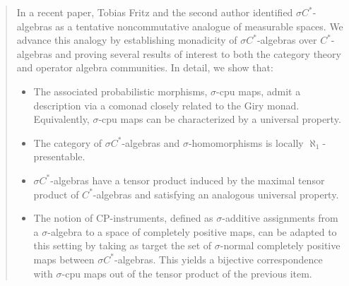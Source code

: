 \begin{abstract}
	In a recent paper, Tobias Fritz and the second author identified  $\sigma C^*$-algebras as a tentative noncommutative analogue of measurable spaces. 
	We advance this analogy by establishing monadicity of $\sigma C^*$-algebras over $C^*$-algebras and proving several results of interest to both the category theory and operator algebra communities.
	In detail, we show that:
	\begin{itemize}
		\item The associated probabilistic morphisms, $\sigma$-cpu maps, admit a description via a comonad closely related to the Giry monad.
		      Equivalently, $\sigma$-cpu maps can be characterized by a universal property.

		\item The category of $\sigma C^*$-algebras and $\sigma$-homomorphisms is locally $\aleph_1$-presentable.

		\item $\sigma C^*$-algebras have a tensor product induced by the maximal tensor product of $C^*$-algebras and satisfying an analogous universal property.

		\item The notion of CP-instruments, defined as $\sigma$-additive assignments from a $\sigma$-algebra to a space of completely positive maps, can be adapted to this setting by taking as target the set of $\sigma$-normal completely positive maps between $\sigma C^*$-algebras. This yields a bijective correspondence with $\sigma$-cpu maps out of the tensor product of the previous item.
	\end{itemize}
\end{abstract}
